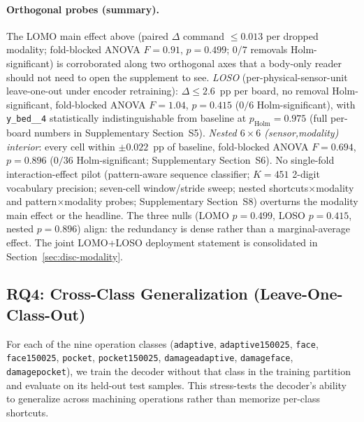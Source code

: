 \documentclass[sensors,article,submit,moreauthors,pdftex]{Definitions/mdpi}
\begin{document}
\paragraph{Orthogonal probes (summary).}\label{sec:abl-lomo-sensor-stub}\label{sec:abl-pilots-stub} The LOMO main effect above (paired $\Delta$ command $\le 0.013$ per dropped modality; fold-blocked ANOVA $F\!=\!0.91$, $p\!=\!0.499$; $0/7$ removals Holm-significant) is corroborated along two orthogonal axes that a body-only reader should not need to open the supplement to see. \emph{LOSO} (per-physical-sensor-unit leave-one-out under encoder retraining): $\Delta\!\le\!2.6$~pp per board, no removal Holm-significant, fold-blocked ANOVA $F\!=\!1.04$, $p\!=\!0.415$ ($0/6$ Holm-significant), with \texttt{y\_bed\_\_4} statistically indistinguishable from baseline at $p_{\text{Holm}}\!=\!0.975$ (full per-board numbers in Supplementary Section~S5). \emph{Nested $6\!\times\!6$ (sensor,modality) interior}: every cell within $\pm 0.022$~pp of baseline, fold-blocked ANOVA $F\!=\!0.694$, $p\!=\!0.896$ ($0/36$ Holm-significant; Supplementary Section~S6). No single-fold interaction-effect pilot (pattern-aware sequence classifier; $K\!=\!451$ 2-digit vocabulary precision; seven-cell window/stride sweep; nested shortcuts$\times$modality and pattern$\times$modality probes; Supplementary Section~S8) overturns the modality main effect or the headline. The three nulls (LOMO $p\!=\!0.499$, LOSO $p\!=\!0.415$, nested $p\!=\!0.896$) align: the redundancy is dense rather than a marginal-average effect. The joint LOMO+LOSO deployment statement is consolidated in Section~\ref{sec:disc-modality}.

\subsection{RQ4: Cross-Class Generalization (Leave-One-Class-Out)}
\label{sec:loco}

For each of the nine operation classes (\texttt{adaptive}, \texttt{adaptive150025}, \texttt{face}, \texttt{face150025}, \texttt{pocket}, \texttt{pocket150025}, \texttt{damageadaptive}, \texttt{damageface}, \texttt{damagepocket}), we train the decoder without that class in the training partition and evaluate on its held-out test samples. This stress-tests the decoder's ability to generalize across machining operations rather than memorize per-class shortcuts.
\end{document}
